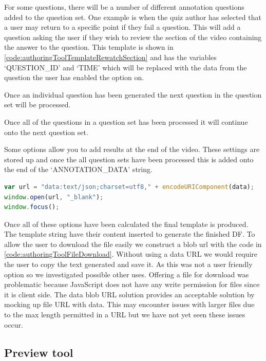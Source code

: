 For some questions, there will be a number of different annotation questions added to the question set. One example is when the quiz author has selected that a user may return to a specific point if they fail a question. This will add a question asking the user if they wish to review the section of the video containing the answer to the question. This template is shown in \autoref{code:authoringToolTemplateRewatchSection} and has the variables `QUESTION\_ID' and `TIME' which will be replaced with the data from the question the user has enabled the option on.

Once an individual question has been generated the next question in the question set will be processed.

Once all of the questions in a question set has been processed it will continue onto the next question set.

Some options allow you to add results at the end of the video. These settings are stored up and once the all question sets have been processed this is added onto the end of the `ANNOTATION\_DATA' string.

\begin{lstlisting}[language=javascript,caption={The final \gls{DF} is offered for downloading using a data blob URL},label={code:authoringToolFileDownload} ]
var url = "data:text/json;charset=utf8," + encodeURIComponent(data);
window.open(url, "_blank");
window.focus();
\end{lstlisting}

Once all of these options have been calculated the final template is produced. The template string have their content inserted to generate the finished \gls{DF}. To allow the user to download the file easily we construct a blob url with the code in \autoref{code:authoringToolFileDownload}. Without using a data URL we would require the user to copy the text generated and save it. As this was not a user friendly option so we investigated possible other uses. Offering a file for download was problematic because JavaScript does not have any write permission for files since it is client side. The data blob URL solution provides an acceptable solution by mocking up file URL with data. This may encounter issues with larger files due to the max length permitted in a URL but we have not yet seen these issues occur.

\subsection{Preview tool}

